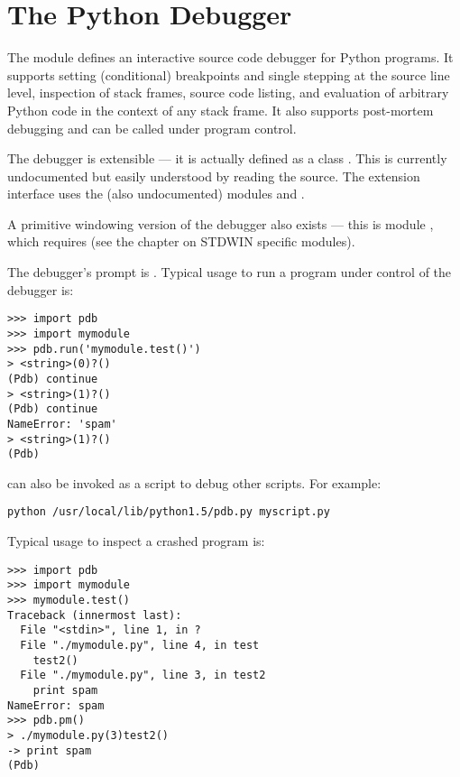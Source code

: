 \chapter{The Python Debugger}




The module  defines an interactive source code debugger for
Python programs.  It supports setting
(conditional) breakpoints and single stepping
at the source line level, inspection of stack frames, source code
listing, and evaluation of arbitrary Python code in the context of any
stack frame.  It also supports post-mortem debugging and can be called
under program control.

The debugger is extensible --- it is actually defined as a class
.
This is currently undocumented but easily understood by reading the
source.  The extension interface uses the (also undocumented) modules
 and .

A primitive windowing version of the debugger also exists --- this is
module , which requires  (see the chapter
on STDWIN specific modules).

The debugger's prompt is .
Typical usage to run a program under control of the debugger is:

\begin{verbatim}
>>> import pdb
>>> import mymodule
>>> pdb.run('mymodule.test()')
> <string>(0)?()
(Pdb) continue
> <string>(1)?()
(Pdb) continue
NameError: 'spam'
> <string>(1)?()
(Pdb) 
\end{verbatim}

 can also be invoked as
a script to debug other scripts.  For example:

\begin{verbatim}
python /usr/local/lib/python1.5/pdb.py myscript.py
\end{verbatim}

Typical usage to inspect a crashed program is:

\begin{verbatim}
>>> import pdb
>>> import mymodule
>>> mymodule.test()
Traceback (innermost last):
  File "<stdin>", line 1, in ?
  File "./mymodule.py", line 4, in test
    test2()
  File "./mymodule.py", line 3, in test2
    print spam
NameError: spam
>>> pdb.pm()
> ./mymodule.py(3)test2()
-> print spam
(Pdb) 
\end{verbatim}

